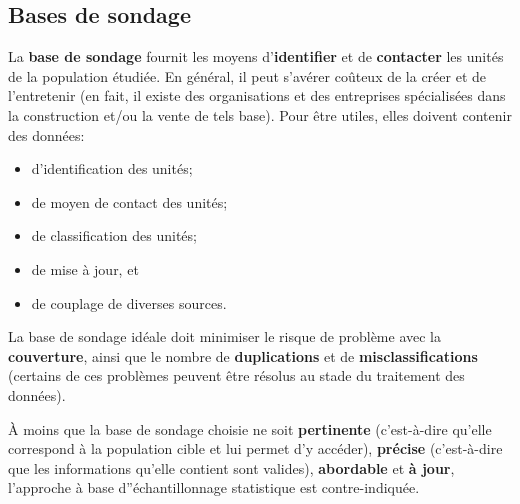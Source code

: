 \subsection{Bases de sondage} La \textbf{base de sondage} fournit les moyens d'\textbf{identifier} et de \textbf{contacter} les unités de la population étudiée. En g\'en\'eral, il  peut s'avérer coûteux de la créer et de l'entretenir (en fait, il existe des organisations et des entreprises spécialisées dans la construction et/ou la vente de tels base). Pour être utiles, elles doivent contenir des données:
\begin{itemize}[noitemsep]
\item d'identification des unités;
\item de moyen de contact  des unités;
\item de classification des unités;
\item de mise à jour, et 
\item de couplage de diverses sources.
\end{itemize} La base de sondage idéale doit minimiser le risque de problème avec la \textbf{couverture}, ainsi que le nombre de \textbf{duplications} et de \textbf{misclassifications} (certains de ces problèmes peuvent être r\'esolus au stade du traitement des données).\par À moins que la base de sondage choisie ne soit \textbf{pertinente} (c'est-à-dire qu'elle correspond à la population cible et lui permet d'y accéder), \textbf{précise} (c'est-à-dire que les informations qu'elle contient sont valides),  \textbf{abordable} et \textbf{à jour}, l'approche à base d''échantillonnage statistique est contre-indiquée. 

